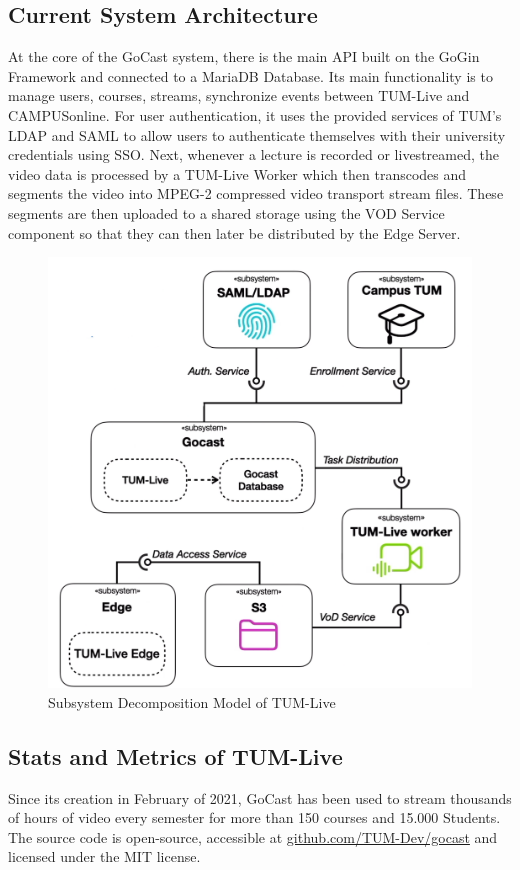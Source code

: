 \subsection{Current System Architecture}

At the core of the GoCast system, there is the main \ac{API} built on the GoGin Framework and connected to a MariaDB Database. Its main functionality is to manage users, courses, streams, synchronize events between TUM-Live and CAMPUSonline. For user authentication, it uses the provided services of \ac{TUM}'s \ac{LDAP} and \ac{SAML} to allow users to authenticate themselves with their university credentials using \ac{SSO}. 
Next, whenever a lecture is recorded or livestreamed, the video data is processed by a TUM-Live Worker which then transcodes and segments the video into MPEG-2 compressed video transport stream files. These segments are then uploaded to a shared storage using the VOD Service component so that they can then later be distributed by the Edge Server.

\begin{figure}[htpb]
    \centering
    \includegraphics[width=320pt]{images/OldDeploymentDiagram.png}
    \caption[Subsystem Decomposition]{Subsystem Decomposition Model of TUM-Live}\label{fig:system-architecture}
\end{figure}

\subsection{Stats and Metrics of TUM-Live}

Since its creation in February of 2021, GoCast has been used to stream thousands of hours of video every semester for more than 150 courses and 15.000 Students. The source code is open-source, accessible at \href{https://github.com/TUM-Dev/gocast}{github.com/TUM-Dev/gocast} and licensed under the MIT license.

